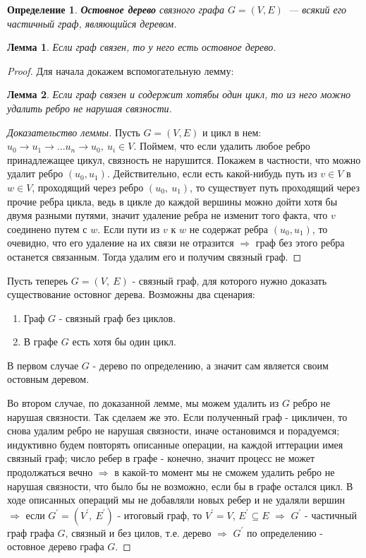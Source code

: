 \documentclass[a4paper,12pt]{article}
\newtheorem*{defin}{Определение}
\newtheorem*{Lemma}{Лемма}
\begin{document}
	\begin{defin} \textbf{Остовное дерево} связного графа $G = (V, E)$ — всякий его частичный граф, являющийся деревом.
	\end{defin}

	\begin{Lemma} 
		Если граф связен, то у него есть остовное дерево. 
	\end{Lemma}

	\begin{proof}
	   Для начала докажем вспомогательную лемму:
		\begin{Lemma} Если граф связен и содержит хотябы один цикл, то из него можно удалить ребро не нарушая связности. 
		\end{Lemma}

		\begin{proof}[Доказательство леммы]
		Пусть $ G = (V, E) $ и цикл в нем: $ u_0 \rightarrow u_1 \rightarrow ... u_n \rightarrow u_0,\ u_i \in V$. Поймем, что если удалить любое ребро принадлежащее цикул, связность не нарушится. Покажем в частности, что можно удалит ребро $(u_0, u_1)$. Действительно, если есть какой-нибудь путь из $v  \in V$ в $w \in V$, проходящий через ребро $ (u_0,\ u_1) $, то существует путь проходящий через прочие ребра цикла, ведь в цикле до каждой вершины можно дойти хотя бы двумя разными путями, значит удаление ребра не изменит того факта, что $v$ соединено путем с $w$. Если пути из $v$ к $w$ не содержат ребра $(u_0, u_1)$, то очевидно, что его удаление на их связи не отразится $\Rightarrow$ граф без этого ребра останется связанным. Тогда удалим его и получим связный граф.
		\end{proof}

		Пусть тепереь $G = (V,\ E)$ - связный граф, для которого нужно доказать существование остовног дерева. Возможны два сценария:
			\begin{enumerate} 
			\item Граф $G$ - связный граф без циклов.
			\item В графе $G$ есть хотя бы один цикл. 
			\end{enumerate}

		В первом случае $G$ - дерево по определению, а значит сам является своим остовным деревом.

		Во втором случае, по доказанной лемме, мы можем удалить из $G$ ребро не нарушая связности. Так сделаем же это. Если полученный граф - цикличен, то снова удалим ребро не нарушая связности, иначе остановимся и порадуемся; индуктивно будем повторять описанные операции, на каждой иттерации имея связный граф; число ребер в графе - конечно, значит процесс не может продолжаться вечно $\Rightarrow$ в какой-то момент мы не сможем удалить ребро не нарушая связности, что было бы не возможно, если бы в графе остался цикл. В ходе описанных операций мы не добавляли новых ребер и не удаляли вершин $\Rightarrow$ если  $G^{\prime} = (V^{\prime},\ E^{\prime})$ - итоговый граф, то $V^{\prime} = V$, $E^{\prime} \subseteq E$ $\Rightarrow$ $G^{\prime}$ - частичный граф графа $G$, связный и без цилов, т.е. дерево $\Rightarrow$ $G^{\prime}$ по определению - остовное дерево графа $G$.
	\end{proof}
\end{document}
